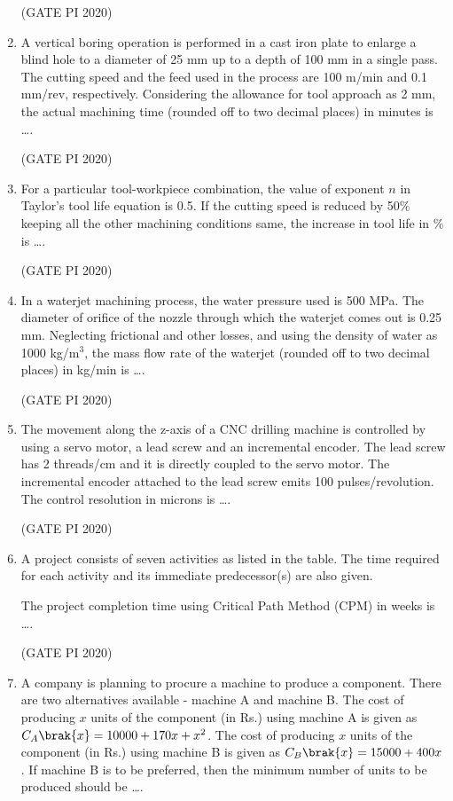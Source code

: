 \documentclass[journal,12pt,onecolumn]{IEEEtran}
\theoremstyle{remark}
\begin{document}
\begin{enumerate}
\hfill (GATE PI 2020)

\item A vertical boring operation is performed in a cast iron plate to enlarge a blind hole to a diameter of 25 mm up to a depth of 100 mm in a single pass. The cutting speed and the feed used in the process are 100 m/min and 0.1 mm/rev, respectively. Considering the allowance for tool approach as 2 mm, the actual machining time (rounded off to two decimal places) in minutes is \dots.

\hfill (GATE PI 2020)

\item For a particular tool-workpiece combination, the value of exponent $n$ in Taylor's tool life equation is 0.5. If the cutting speed is reduced by 50\% keeping all the other machining conditions same, the increase in tool life in \% is \dots.

\hfill (GATE PI 2020)

\item In a waterjet machining process, the water pressure used is 500 MPa. The diameter of orifice of the nozzle through which the waterjet comes out is 0.25 mm. Neglecting frictional and other losses, and using the density of water as 1000 kg/m$^3$, the mass flow rate of the waterjet (rounded off to two decimal places) in kg/min is \dots.

\hfill (GATE PI 2020)

\item The movement along the z-axis of a CNC drilling machine is controlled by using a servo motor, a lead screw and an incremental encoder. The lead screw has 2 threads/cm and it is directly coupled to the servo motor. The incremental encoder attached to the lead screw emits 100 pulses/revolution. The control resolution in microns is \dots.

\hfill (GATE PI 2020)

\item A project consists of seven activities as listed in the table. The time required for each activity and its immediate predecessor(s) are also given.



The project completion time using Critical Path Method (CPM) in weeks is \dots.

\hfill (GATE PI 2020)
\item A company is planning to procure a machine to produce a component. There are two alternatives available - machine A and machine B. The cost of producing $x$ units of the component (in Rs.) using machine A is given as $C_A\brak{x} = 10000 + 170x + x^2$. The cost of producing $x$ units of the component (in Rs.) using machine B is given as $C_B\brak{x} = 15000 + 400x$. If machine B is to be preferred, then the minimum number of units to be produced should be \dots.


\end{enumerate}
\end{document}

